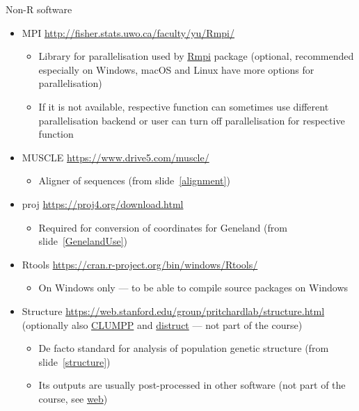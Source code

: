 \documentclass[compress, ucs, xelatex, 11pt, xcolor=svgnames, aspectratio=169,
	hyperref={
		bookmarks=true,
		unicode=true,
		colorlinks=true,
		pdftitle={Molecular data in R},
		plainpages=false,
		pdfauthor={Vojtech Zeisek},
		pdfsubject={Course about phylogeny and evolution in R},
		pdfcreator={XeLaTeX},
		pdfkeywords={R, evolution, phylogeny, molecular data},
		linkcolor=Crimson, %
		anchorcolor=Magenta, %
		citecolor=Magenta, %
		filecolor=Magenta, %
		menucolor=Magenta, %
		urlcolor=DodgerBlue, %
		pdftex},
	url={hyphens, lowtilde} %
	]{beamer}
\begin{document}
\begin{frame}[allowframebreaks]{Non-R software}
\begin{itemize}
\begin{itemize}
		\end{itemize}
		\item MPI \url{http://fisher.stats.uwo.ca/faculty/yu/Rmpi/} %
		\begin{itemize}
			\item Library for parallelisation used by \href{https://CRAN.R-project.org/package=Rmpi}{Rmpi} package (optional, recommended especially on Windows, macOS and Linux have more options for parallelisation)
			\item If it is not available, respective function can sometimes use different parallelisation backend or user can turn off parallelisation for respective function
		\end{itemize}
		\item MUSCLE \url{https://www.drive5.com/muscle/}
		\begin{itemize}
			\item Aligner of sequences (from slide~\ref{alignment})
		\end{itemize}
		\item proj \url{https://proj4.org/download.html}
		\begin{itemize}
			\item Required for conversion of coordinates for Geneland (from slide~\ref{GenelandUse})
		\end{itemize}
		\item Rtools \url{https://cran.r-project.org/bin/windows/Rtools/}
		\begin{itemize}
			\item \alert{On Windows only} --- to be able to compile source packages on Windows
		\end{itemize}
		\item Structure \url{https://web.stanford.edu/group/pritchardlab/structure.html} (optionally also \href{https://web.stanford.edu/group/rosenberglab/clumpp.html}{CLUMPP} and \href{https://web.stanford.edu/group/rosenberglab/distruct.html}{distruct} --- not part of the course)
		\begin{itemize}
			\item De facto standard for analysis of population genetic structure (from slide~\ref{structure})
			\item Its outputs are usually post-processed in other software (not part of the course, see \href{https://trapa.cz/en/structure-r-linux}{web})
		\end{itemize}
	\end{itemize}
\end{frame}
\end{document}
